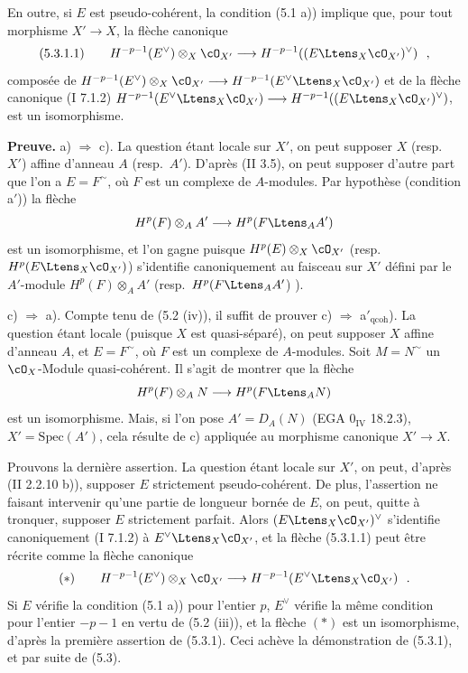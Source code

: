 \smallskip

En outre, si $E$ est pseudo-coh\'{e}rent, la condition (5.1 a)) implique que, pour tout morphisme $X' \longrightarrow X$, la fl\`{e}che canonique
\[
\mathrm{(5.3.1.1)} \qquad H^{-p-1}(E^\vee) \otimes_X \cO_{X'} \longrightarrow H^{-p-1}((E \Ltens_X \cO_{X'})^\vee)\ \ ,
\]
compos\'{e}e de $H^{-p-1}(E^\vee) \otimes_X \cO_{X'} \longrightarrow H^{-p-1}(E^{\vee} \Ltens_X \cO_{X'})$ et de la fl\`{e}che canonique (I 7.1.2) $H^{-p-1}(E^\vee \Ltens_X \cO_{X'}) \longrightarrow H^{-p-1}((E \Ltens_X \cO_{X'})^\vee)$, est un isomorphisme.

\medskip

\noindent\textbf{Preuve.} a) $\Longrightarrow$ c). La question \'{e}tant locale sur $X'$, on peut supposer $X$ (resp.\ $X'$) affine d'anneau $A$ (resp.\ $A'$). D'apr\`{e}s (II 3.5), on peut supposer d'autre part que l'on a $E = F^\sim$, o\`{u} $F$ est un complexe de $A$-modules. Par hypoth\`{e}se (condition a$'$)) la fl\`{e}che
\[
H^p(F) \otimes_A A' \longrightarrow H^p(F \Ltens_A A')
\]
est un isomorphisme, et l'on gagne puisque $H^p(E) \otimes_X \cO_{X'}$ (resp.\ $H^p(E \Ltens_X \cO_{X'})$) s'identifie canoniquement au faisceau sur $X'$ d\'{e}fini par le $A'$-module $H^p(F) \otimes_A A'$ (resp.\ $H^p(F \Ltens_A A'$) ).

\smallskip

c) $\Longrightarrow$ a). Compte tenu de (5.2 (iv)), il suffit de prouver c) $\Longrightarrow$ a$'_{\mathrm{qcoh}}$). La question \'{e}tant locale (puisque $X$ est quasi-s\'{e}par\'{e}), on peut supposer $X$ affine d'anneau $A$, et $E = F^\sim$, o\`{u} $F$ est un complexe de $A$-modules. Soit $M = N^\sim$ un $\cO_X$-Module quasi-coh\'{e}rent. Il s'agit de montrer que la fl\`{e}che
\[
H^p(F) \otimes_A N \longrightarrow H^p(F \Ltens_A N)
\]
est un isomorphisme. Mais, si l'on pose $A' = D_A(N)$ (EGA $0_{\mathrm{IV}}$ 18.2.3), $X' = \mathrm{Spec}(A')$, cela r\'{e}sulte de c) appliqu\'{e}e au morphisme canonique $X' \longrightarrow X$.

Prouvons la derni\`{e}re assertion. La question \'{e}tant locale sur $X'$, on peut, d'apr\`{e}s (II 2.2.10 b)), supposer $E$ strictement pseudo-coh\'{e}rent. De plus, l'assertion ne faisant intervenir qu'une partie de longueur born\'{e}e de $E$, on peut, quitte \`{a} tronquer, supposer $E$ strictement parfait. Alors $(E \Ltens_X \cO_{X'})^\vee$ s'identifie canoniquement (I 7.1.2) \`{a} $E^\vee \Ltens_X \cO_{X'}$, et la fl\`{e}che (5.3.1.1) peut \^{e}tre r\'{e}crite comme la fl\`{e}che canonique
\[
(*) \qquad H^{-p-1}(E^\vee) \otimes_X \cO_{X'} \longrightarrow H^{-p-1}(E^\vee \Ltens_X \cO_{X'})\ \ .
\]
Si $E$ v\'{e}rifie la condition (5.1 a)) pour l'entier $p$, $E^\vee$ v\'{e}rifie la m\^{e}me condition pour l'entier $-p-1$ en vertu de (5.2 (iii)), et la fl\`{e}che $(*)$ est un isomorphisme, d'apr\`{e}s la premi\`{e}re assertion de (5.3.1). Ceci ach\`{e}ve la d\'{e}monstration de (5.3.1), et par suite de (5.3).

